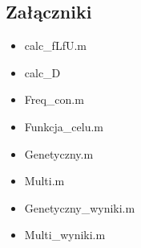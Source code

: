 \documentclass[10pt,a4paper]{article}
\begin{document}
\subsection{Załączniki}
\begin{itemize}
\item calc\_fLfU.m
\item calc\_D
\item Freq\_con.m
\item Funkcja\_celu.m
\item Genetyczny.m
\item Multi.m
\item Genetyczny\_wyniki.m
\item Multi\_wyniki.m
\end{itemize}
\end{document}
